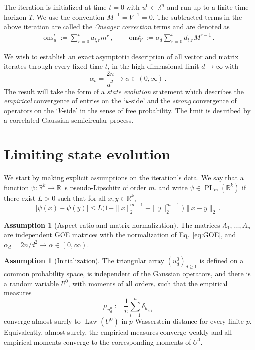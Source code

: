 \documentclass[11pt]{article}
\theoremstyle{definition}
\newtheorem{assumption}[theorem]{Assumption}
\theoremstyle{remark}
\numberwithin{equation}{section}
\numberwithin{theorem}{section}
\newcommand{\R}{\mathbb R}
\newcommand{\Law}{\operatorname{Law}}
\newcommand{\ons}{\operatorname{ons}}
\newcommand{\PL}{\operatorname{PL}}
\begin{document}
The iteration is initialized at time $t=0$ with $u^0\in \R^n$ and run up to a finite time horizon $T$. We use the convention $M^{-1} = V^{-1} = 0$.
%
The subtracted terms in the above iteration are called the \emph{Onsager correction} terms and are denoted as
\begin{align}\label{eq:onsdef}
  \ons_u^t :=\sum_{r=0}^{t} a_{t,r} m^r\,,
  \qquad
\ons_V^t := \alpha_d \sum_{r=0}^t d_{t,r} M^{r-1}\,.
\end{align}

We wish to establish an exact asymptotic description of all vector and matrix iterates through every fixed time $t$, in the high-dimensional limit $d\to\infty$ with
\begin{equation}\label{eq:alpha}
  \alpha_d =  \frac{2n}{d^2} \longrightarrow \alpha\in(0,\infty)\,.
\end{equation}  
The result will take the form of a \emph{state evolution} statement which describes the \emph{empirical} convergence of entries on the `$u$-side' and the \emph{strong} convergence of operators on the `$V$-side' in the sense of free probability. The limit is described by a correlated Gaussian-semicircular process. 

\section{Limiting state evolution}
We start by making explicit assumptions on the iteration's data. 
We say that a function $\psi:\R^k\to\R$ is pseudo-Lipschitz of order $m$, and write $\psi \in \PL_m(\R^k)$ if there exist $L>0$ such that for all $x,y \in \R^k$,
\begin{equation}
    \big|\psi(x) - \psi(y)\big| \le L\big(1+\|x\|_2^{m-1}+\|y\|_2^{m-1}\big) \|x-y\|_2\,.
\end{equation}

\begin{assumption}[Aspect ratio and matrix normalization]\label{ass:aspect}
The matrices $A_1,\ldots,A_n$ are independent GOE matrices with the normalization of Eq.~\eqref{eq:GOE}, and $\alpha_d=2n/d^2\to\alpha\in(0,\infty)$.
\end{assumption}

\begin{assumption}[Initialization]\label{ass:init}
The triangular array $(u_d^0)_{d\ge1}$ is defined on a common probability space, is independent of the Gaussian operators, and there is a random variable $U^0$, with moments of all orders, such that the empirical
measures
\[
  \widehat\mu_{u_d^0}:=\frac1n\sum_{i=1}^n\delta_{u_{d,i}^0}
\]
converge almost surely to $\Law(U^0)$ in $p$-Wasserstein distance for every finite $p$. Equivalently, almost surely, the empirical measures converge weakly and all empirical moments converge to the corresponding moments of $U^0$.
\end{assumption}
\end{document}
